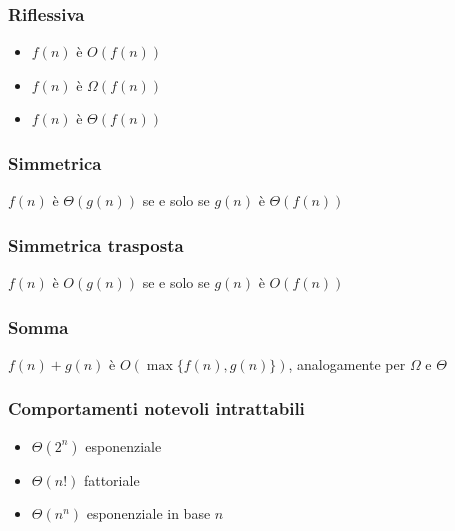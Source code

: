 \documentclass[12pt, a4paper]{report}
\begin{document}
\subsubsection{Riflessiva}
\begin{itemize}
    \item $f(n)$ è $O(f(n))$
    \item $f(n)$ è $\Omega(f(n))$
    \item $f(n)$ è $\Theta(f(n))$
\end{itemize}
\subsubsection{Simmetrica}
$f(n)$ è $\Theta(g(n))$ se e solo se $g(n)$ è $\Theta(f(n))$
\subsubsection{Simmetrica trasposta}
$f(n)$ è $O(g(n))$ se e solo se $g(n)$ è $O(f(n))$
\subsubsection{Somma}
$f(n)+g(n)$ è $O(\max\{f(n),g(n)\})$, analogamente per $\Omega$ e $\Theta$
\subsubsection{Comportamenti notevoli intrattabili}
\begin{itemize}
    \item $\Theta(2^{n})$ esponenziale
    \item $\Theta(n!)$ fattoriale
    \item $\Theta(n^{n})$ esponenziale in base $n$
\end{itemize}
\newpage
\end{document}
